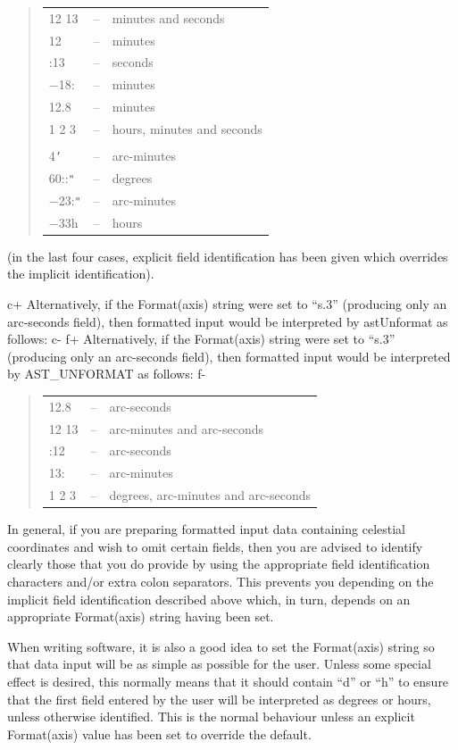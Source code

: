 \documentclass[twoside,11pt]{article}
\begin{document}
\begin{quote}
\begin{tabular}{lll}
12 13 & -- & minutes and seconds \\
12 & -- & minutes \\
:13 & -- & seconds \\
$-$18: & -- & minutes \\
12.8 & -- & minutes \\
1 2 3 & -- & hours, minutes and seconds \\
& & \\
4{\tt{'}} & -- & arc-minutes \\
60::{\tt{"}} & -- & degrees \\
$-$23:{\tt{"}} & -- & arc-minutes \\
$-$33h & -- & hours
\end{tabular}
\end{quote}

(in the last four cases, explicit field identification has been given
which overrides the implicit identification).

c+
Alternatively, if the Format(axis) string were set to ``s.3''
(producing only an arc-seconds field), then formatted input would be
interpreted by astUnformat as follows:
c-
f+
Alternatively, if the Format(axis) string were set to ``s.3''
(producing only an arc-seconds field), then formatted input would be
interpreted by AST\_UNFORMAT as follows:
f-

\begin{quote}
\begin{tabular}{lll}
12.8 & -- & arc-seconds \\
12 13 & -- & arc-minutes and arc-seconds \\
:12 & -- & arc-seconds \\
13: & -- & arc-minutes \\
1 2 3 & -- & degrees, arc-minutes and arc-seconds
\end{tabular}
\end{quote}

In general, if you are preparing formatted input data containing
celestial coordinates and wish to omit certain fields, then you are
advised to identify clearly those that you do provide by using the
appropriate field identification characters and/or extra colon
separators. This prevents you depending on the implicit field
identification described above which, in turn, depends on an
appropriate Format(axis) string having been set.

When writing software, it is also a good idea to set the Format(axis)
string so that data input will be as simple as possible for the
user. Unless some special effect is desired, this normally means that
it should contain ``d'' or ``h'' to ensure that the first field
entered by the user will be interpreted as degrees or hours, unless
otherwise identified. This is the normal behaviour unless an explicit
Format(axis) value has been set to override the default.
\end{document}
